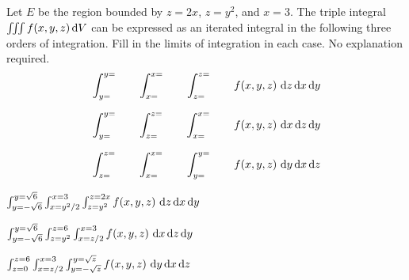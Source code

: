 \begin{question}[M200 2014D] %
Let $E$ be the region bounded by $z = 2x$, $z = y^2$, and $x = 3$. 
The triple integral $\iiint f(x,y,z)\,\mathrm{d}V$ can be expressed 
as an iterated integral in the following three orders
of integration. Fill in the limits of integration in each case. 
No explanation required.
\begin{align*}
&\int_{y=}^{y=}\qquad\int_{x=}^{x=}\qquad\int_{z=}^{z=}\qquad
                f(x,y,z)\ \mathrm{d}z\,\mathrm{d}x\,\mathrm{d}y \\[0.1in]
&\int_{y=}^{y=}\qquad\int_{z=}^{z=}\qquad\int_{x=}^{x=}\qquad
                f(x,y,z)\ \mathrm{d}x\,\mathrm{d}z\,\mathrm{d}y \\[0.1in]
&\int_{z=}^{z=}\qquad\int_{x=}^{x=}\qquad\int_{y=}^{y=}\qquad
                f(x,y,z)\ \mathrm{d}y\,\mathrm{d}x\,\mathrm{d}z 
\end{align*}
\end{question}

%

\begin{answer}
$\int_{y=-\sqrt{6}}^{y=\sqrt{6}}\int_{x=y^2/2}^{x=3}\int_{z=y^2}^{z=2x}
                f(x,y,z)\ \mathrm{d}z\,\mathrm{d}x\,\mathrm{d}y$

$\int_{y=-\sqrt{6}}^{y=\sqrt{6}}\int_{z=y^2}^{z=6}\int_{x=z/2}^{x=3}
                f(x,y,z)\ \mathrm{d}x\,\mathrm{d}z\,\mathrm{d}y$

$\int_{z=0}^{z=6}\int_{x=z/2}^{x=3}\int_{y=-\sqrt{z}}^{y=\sqrt{z}}
                f(x,y,z)\ \mathrm{d}y\,\mathrm{d}x\,\mathrm{d}z$
\end{answer}


